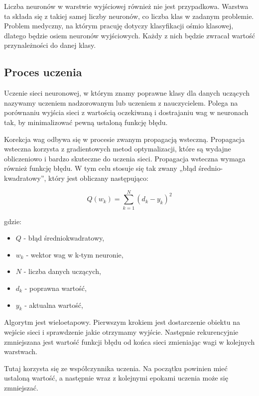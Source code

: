     Liczba neuronów w warstwie wyjściowej również nie jest przypadkowa.
    Warstwa ta składa się z takiej samej liczby neuronów, co liczba klas w zadanym problemie.
    Problem medyczny, na którym pracuję dotyczy klasyfikacji ośmio klasowej, dlatego będzie osiem neuronów wyjściowych.
    Każdy z nich będzie zwracał wartość przynależności do danej klasy.

    \subsection{Proces uczenia}\label{subsec:procesUczenia}

    Uczenie sieci neuronowej, w którym znamy poprawne klasy dla danych uczących nazywamy uczeniem nadzorowanym lub uczeniem z nauczycielem.
    Polega na porównaniu wyjścia sieci z wartością oczekiwaną i dostrajaniu wag w neuronach tak, by minimalizować pewną ustaloną funkcję błędu.

    Korekcja wag odbywa się w procesie zwanym propagacją wsteczną.
    Propagacja wsteczna korzysta z gradientowych metod optymalizacji, które są wydajne obliczeniowo i bardzo skuteczne do uczenia sieci.
    Propagacja wsteczna wymaga również funkcję błędu.
    W tym celu stosuje się tak zwany „błąd średnio-kwadratowy”, który jest obliczany następująco:

    \[
        Q(w_k) = \sum_{k=1}^{N}{(d_k - y_k) ^ 2}
    \]

    gdzie:

    \begin{itemize}
        \item $Q$ - błąd średniokwadratowy,
        \item $w_k$ - wektor wag w k-tym neuronie,
        \item $N$ - liczba danych uczących,
        \item $d_k$ - poprawna wartość,
        \item $y_k$ - aktualna wartość,
    \end{itemize}

    Algorytm jest wieloetapowy.
    Pierwszym krokiem jest dostarczenie obiektu na wejście sieci i sprawdzenie jakie otrzymamy wyjście.
    Następnie rekurencyjnie zmniejszana jest wartość funkcji błędu od końca sieci zmieniając wagi w kolejnych warstwach.

    Tutaj korzysta się ze współczynnika uczenia.
    Na początku powinien mieć ustaloną wartość, a następnie wraz z kolejnymi epokami uczenia może się zmniejszać.

